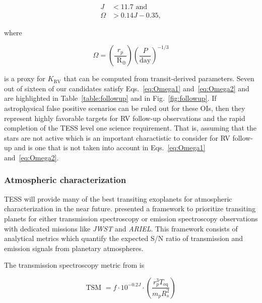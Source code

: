 \begin{align}
  J &< 11.7 \text{ and} \label{eq:Omega1} \\
  \Omega &> 0.14J - 0.35, \label{eq:Omega2}
\end{align}

\noindent where

\begin{equation}
\Omega = \left( \frac{r_p}{\text{ R}_{\oplus}} \right) \left( \frac{P}{\text{day}}  \right)^{-1/3}
\end{equation}

\noindent is a proxy for $K_{\text{RV}}$ that can be computed from transit-derived parameters.
Seven out of sixteen of our candidates satisfy Eqs.~\ref{eq:Omega1} and~\ref{eq:Omega2} and are highlighted
in Table~\ref{table:followup} and in Fig.~\ref{fig:followup}.
If astrophysical false positive scenarios can be ruled out for these OIs, then
they represent highly favorable targets for RV follow-up observations and the rapid completion of the
TESS level one science requirement. That is, assuming that the stars are not active which is an
important charactistic to consider for RV follow-up \citep{moutou17} and is one that is not taken into
account in Eqs.~\ref{eq:Omega1} and~\ref{eq:Omega2}.

\subsubsection{Atmospheric characterization} \label{sect:atmospheres}
TESS will provide many of the best transiting exoplanets for atmospheric characterization in the
near future. \cite{kempton18} presented a framework to prioritize transiting planets for
either transmission spectroscopy or emission spectroscopy observations with dedicated missions
like \emph{JWST} and \emph{ARIEL}. This framework consists of analytical metrics which quantify
the expected S/N ratio of transmission and emission signals from planetary atmospheres.

The transmission spectroscopy metric from \cite{kempton18} is

\begin{equation}
  \text{TSM } = f \cdot 10^{-0.2J} \cdot \left( \frac{r_p^3 T_{\text{eq}}}{m_p R_s^2} \right)
  \label{eq:tsm}
\end{equation}

